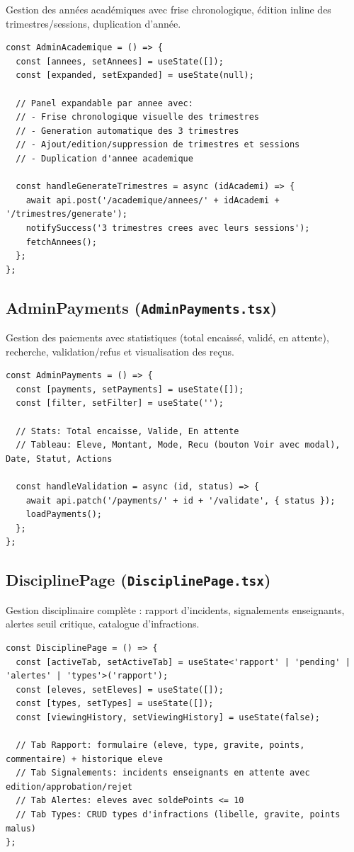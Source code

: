 \documentclass[12pt,a4paper]{article}
\begin{document}
Gestion des années académiques avec frise chronologique, édition inline des trimestres/sessions, duplication d'année.

\begin{lstlisting}[style=code]
const AdminAcademique = () => {
  const [annees, setAnnees] = useState([]);
  const [expanded, setExpanded] = useState(null);

  // Panel expandable par annee avec:
  // - Frise chronologique visuelle des trimestres
  // - Generation automatique des 3 trimestres
  // - Ajout/edition/suppression de trimestres et sessions
  // - Duplication d'annee academique

  const handleGenerateTrimestres = async (idAcademi) => {
    await api.post('/academique/annees/' + idAcademi + '/trimestres/generate');
    notifySuccess('3 trimestres crees avec leurs sessions');
    fetchAnnees();
  };
};
\end{lstlisting}

\subsection{AdminPayments (\texttt{AdminPayments.tsx})}

Gestion des paiements avec statistiques (total encaissé, validé, en attente), recherche, validation/refus et visualisation des reçus.

\begin{lstlisting}[style=code]
const AdminPayments = () => {
  const [payments, setPayments] = useState([]);
  const [filter, setFilter] = useState('');

  // Stats: Total encaisse, Valide, En attente
  // Tableau: Eleve, Montant, Mode, Recu (bouton Voir avec modal), Date, Statut, Actions

  const handleValidation = async (id, status) => {
    await api.patch('/payments/' + id + '/validate', { status });
    loadPayments();
  };
};
\end{lstlisting}

\subsection{DisciplinePage (\texttt{DisciplinePage.tsx})}

Gestion disciplinaire complète : rapport d'incidents, signalements enseignants, alertes seuil critique, catalogue d'infractions.

\begin{lstlisting}[style=code]
const DisciplinePage = () => {
  const [activeTab, setActiveTab] = useState<'rapport' | 'pending' | 'alertes' | 'types'>('rapport');
  const [eleves, setEleves] = useState([]);
  const [types, setTypes] = useState([]);
  const [viewingHistory, setViewingHistory] = useState(false);

  // Tab Rapport: formulaire (eleve, type, gravite, points, commentaire) + historique eleve
  // Tab Signalements: incidents enseignants en attente avec edition/approbation/rejet
  // Tab Alertes: eleves avec soldePoints <= 10
  // Tab Types: CRUD types d'infractions (libelle, gravite, points malus)
};
\end{lstlisting}
\end{document}
